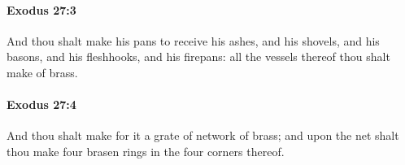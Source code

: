 		\paragraph{Exodus 27:3} %
			\label{EXODUS-27-3}

			And thou shalt make his pans to receive his ashes, and his shovels, and his basons, and his fleshhooks, and his firepans: all the vessels thereof thou shalt make of brass.


		\paragraph{Exodus 27:4} %
			\label{EXODUS-27-4}

			And thou shalt make for it a grate of network of brass; and upon the net shalt thou make four brasen rings in the four corners thereof.


